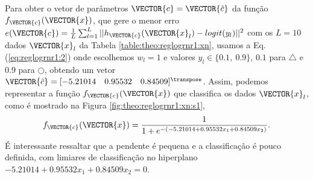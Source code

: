 \begin{SolutionT}\label{sol:theo:reglogrnr1:s1}
Para obter o vetor de parâmetros $\VECTOR{c}=\VECTOR{\hat{c}}$ da função $f_{\VECTOR{c}}(\VECTOR{x})$, 
que gere o menor erro $e(\VECTOR{c}) = \frac{1}{L} \sum_{l=1}^{L} ||h_{\VECTOR{c}}(\VECTOR{x}_l)-logit(y_l)||^2$
com os $L=10$ dados $\VECTOR{x}_l$ da Tabela \ref{table:theo:reglogrnr1:xn},
usamos a Eq. (\ref{eq:reglogrnr1:2}) onde escolhemos $w_l=1$ e valores $y_l \in \{0.1,~ 0.9\}$,
$0.1$ para $\bigtriangleup$ e $0.9$ para $\bigcirc$,
obtendo um vetor $\VECTOR{\hat{c}}=[-5.21014\quad 0.95532\quad 0.84509]^{\transpose}$.
Assim, podemos representar a função $f_{\VECTOR{c}}(\VECTOR{x})$ que classifica os dados $\VECTOR{x}_l$, 
como é mostrado na Figura \ref{fig:theo:reglogrnr1:xn:s1},
\begin{equation}
f_{\VECTOR{c}}(\VECTOR{x})= \frac{1}{1+e^{-(-5.21014  +0.95532 x_1+ 0.84509 x_2)}}.
\end{equation}
É interessante ressaltar que a pendente é pequena e a classificação é pouco definida,
com limiares de classificação no hiperplano $-5.21014  +0.95532 x_1+ 0.84509 x_2=0$.
\end{SolutionT}

